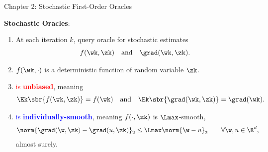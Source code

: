 \documentclass[mathserif,notheorems, hyperref={colorlinks, citecolor=blue, urlcolor=blue, linkcolor=blue}]{beamer}
\begin{document}
    \begin{frame}{Chapter 2: Stochastic First-Order Oracles}

        \textbf{Stochastic Oracles}:
        \begin{enumerate}
            \item At each iteration \( k \), query oracle \oracle{} for stochastic estimates 
                \[ f(\wk, \zk) \quad \text{and} \quad \grad(\wk, \zk). \] 
            \item \( f(\wk, \cdot) \) is a deterministic function of random variable \( \zk \). 
                \vspace{1ex}
            \item \textcolor{red}{\oracle{} is \textbf{unbiased}}, meaning 
            \[ \Ek\sbr{f(\wk, \zk)} = f(\wk) \quad \text{and} \quad \Ek\sbr{\grad(\wk, \zk)} = \grad(\wk). \]%
            \item \textcolor{blue}{\oracle{} is \textbf{individually-smooth}}, meaning \( f(\cdot, \zk) \) is \( \Lmax \)-smooth, 
                \begin{align*}
                    \norm{\grad(\w, \zk) - \grad(u, \zk)}_2 &\leq \Lmax \norm{\w - u}_2 \tag*{\(\forall \w, u \in \R^d \),} 
                \end{align*}
                almost surely.
        \end{enumerate}

    \end{frame}
\end{document}
